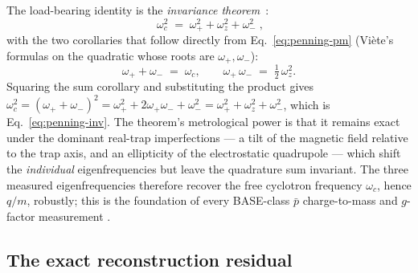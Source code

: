 The load-bearing identity is the \emph{invariance
theorem}~\citep{brown1986geonium}:
\begin{equation}
\boxed{\;\omega_c^{2} \;=\; \omega_+^{2} + \omega_z^{2} + \omega_-^{2}\;},
\label{eq:penning-inv}
\end{equation}
with the two corollaries that follow directly from
Eq.~\eqref{eq:penning-pm} (Vi\`{e}te's formulas on the quadratic whose roots
are $\omega_+,\omega_-$):
\begin{equation}
\omega_+ + \omega_- \;=\; \omega_c,
\qquad
\omega_+\,\omega_- \;=\; \tfrac12\,\omega_z^2 .
\label{eq:penning-corr}
\end{equation}
Squaring the sum corollary and substituting the product gives
$\omega_c^2=(\omega_++\omega_-)^2=\omega_+^2+2\omega_+\omega_-+\omega_-^2
=\omega_+^2+\omega_z^2+\omega_-^2$, which is Eq.~\eqref{eq:penning-inv}.
The theorem's metrological power is that it remains exact under the dominant
real-trap imperfections --- a tilt of the magnetic field relative to the
trap axis, and an ellipticity of the electrostatic quadrupole --- which shift
the \emph{individual} eigenfrequencies but leave the quadrature sum
invariant. The three measured eigenfrequencies therefore recover the free
cyclotron frequency $\omega_c$, hence $q/m$, robustly; this is the foundation
of every BASE-class $\bar p$ charge-to-mass and $g$-factor measurement
\citep{smorra2017base}.

\subsection{The exact reconstruction residual}
\label{app:penning-resid}

